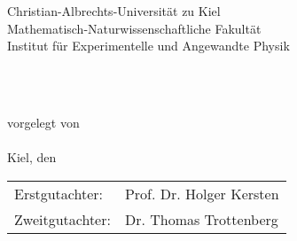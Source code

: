 \begin{titlepage}
\cleardoublepage{}
   
\begin{minipage}[t]{.6\linewidth} %
     \vspace*{0pt} {\Large Christian-Albrechts-Universität zu Kiel\\}
                Mathematisch-Naturwissenschaftliche Fakultät\\
                Institut für Experimentelle und Angewandte Physik\\
\end{minipage}%


\vspace*{4.2cm}

	{\Huge\begin{center}
		{\textbf{\@title}}
	\end{center}}

	\vspace{2.cm}
	
	\begin{center}
		{\large{\textbf{\@subject}}\\}
		\vspace{0.5cm}
	\end{center}

	\vspace{1cm}

	\begin{center}
		{\textbf{}}\\
		{vorgelegt von\\}
		{\@author\\}
		\vspace{0.5cm}
		{Kiel, den \@date}
	\end{center}

	\vspace*{\fill}
	\pagestyle{empty}
	
	\begin{flushleft}
	    \begin{tabular}{l l}
            Erstgutachter: & Prof. Dr. Holger Kersten\\
		    Zweitgutachter: & Dr. Thomas Trottenberg\\
        \end{tabular}
	\end{flushleft}
	

\end{titlepage}